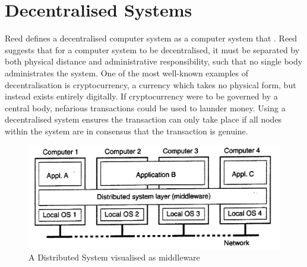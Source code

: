 \documentclass[a4paper, 11pt]{report}
\begin{document}
\section{Decentralised Systems}
Reed defines a decentralised computer system as a computer system that  \cite{namingSyncDec}. Reed suggests that for a computer system to be decentralised, it must be separated by both physical distance and administrative responsibility, such that no single body administrates the system. One of the most well-known examples of decentralisation is \gls{cryptocurrency}, a currency which takes no physical form, but instead exists entirely digitally. If cryptocurrency were to be governed by a central body, nefarious transactions could be used to launder money. Using a decentralised system ensures the transaction can only take place if all nodes within the system are in consensus that the transaction is genuine.

\begin{center}
	\begin{figure}[!htb]
		\includegraphics[width=\textwidth,keepaspectratio]{TanenbaumDistributed}
		\caption{A Distributed System visualised as \gls{middleware} \cite{tanenbaumdist}} 
		\label{fig:middleware}
	\end{figure}
\end{center}
\end{document}

